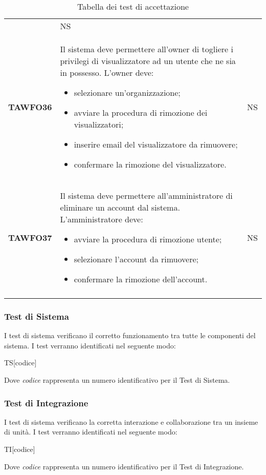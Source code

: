 \documentclass[../piano-di-qualifica.tex]{subfiles}
\begin{document}
\begin{centering}
\begin{longtable}[H]{>{\centering\bfseries}m{3cm} >{}p{10cm} >{\centering\arraybackslash}m{3cm}}
\begin{itemize}
        \end{itemize}
        & NS \\
        TAWFO36      & Il sistema deve permettere all'owner di togliere i privilegi di visualizzatore ad un utente che ne sia in possesso. \newline
        L'owner deve:
        \begin{itemize}
         \item selezionare un'organizzazione;
         \item avviare la procedura di rimozione dei visualizzatori;
         \item inserire email del visualizzatore da rimuovere;
         \item confermare la rimozione del visualizzatore.
        \end{itemize}
        & NS \\
        TAWFO37      & Il sistema deve permettere all'amministratore di eliminare un account dal sistema. \newline
        L'amministratore deve:
        \begin{itemize}
         \item avviare la procedura di rimozione utente;
         \item selezionare l'account da rimuovere;
         \item confermare la rimozione dell'account.
        \end{itemize}
        & NS \\
        \caption{Tabella dei test di accettazione}%
        \label{tab:test_accettazione}
      \end{longtable}
    \end{centering}
    \subsubsection{Test di Sistema}%
  \label{subs:sistema}
    I test di sistema verificano il corretto funzionamento tra tutte le componenti del sistema. I test verranno identificati nel seguente modo:
    \begin{center}
      TS[codice]
    \end{center}
    Dove \textit{codice} rappresenta un numero identificativo per il Test di Sistema.
  \subsubsection{Test di Integrazione}%
  \label{subs:integrazione}
    I test di sistema verificano la corretta interazione e collaborazione tra un insieme di unità. I test verranno identificati nel seguente modo:
    \begin{center}
      TI[codice]
    \end{center}
    Dove \textit{codice} rappresenta un numero identificativo per il Test di Integrazione.
\end{document}
